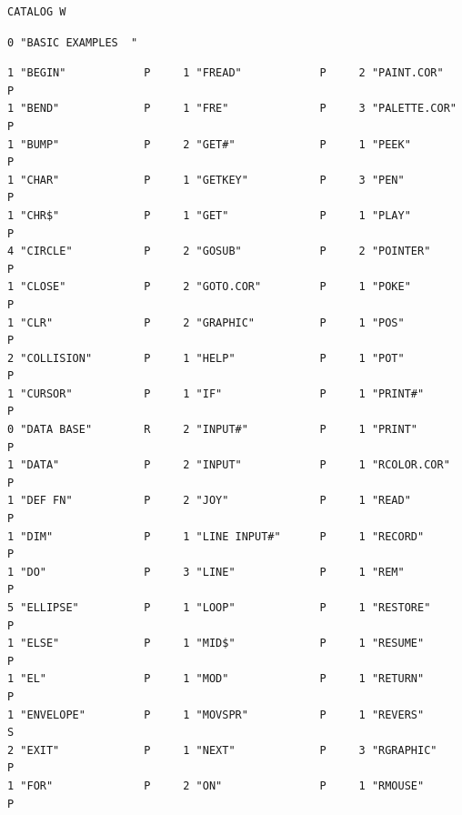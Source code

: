 \begin{description}[leftmargin=2cm,style=nextline]
\begin{tcolorbox}[colback=black,coltext=white]
\verbatimfont{\codefont}
\begin{verbatim}
CATALOG W
\end{verbatim}
\begin{tcolorbox}[colback=white,coltext=black,arc=0mm,boxrule=0mm,
left*=0.5mm,right*=0mm,top=0mm,bottom=0mm,nobeforeafter,
left skip=0.5mm,
width=28mm,height=3mm,valign=center]
\begin{verbatim}
0 "BASIC EXAMPLES  "
\end{verbatim}
\end{tcolorbox}
\begin{verbatim}
1 "BEGIN"            P     1 "FREAD"            P     2 "PAINT.COR"        P
1 "BEND"             P     1 "FRE"              P     3 "PALETTE.COR"      P
1 "BUMP"             P     2 "GET#"             P     1 "PEEK"             P
1 "CHAR"             P     1 "GETKEY"           P     3 "PEN"              P
1 "CHR$"             P     1 "GET"              P     1 "PLAY"             P
4 "CIRCLE"           P     2 "GOSUB"            P     2 "POINTER"          P
1 "CLOSE"            P     2 "GOTO.COR"         P     1 "POKE"             P
1 "CLR"              P     2 "GRAPHIC"          P     1 "POS"              P
2 "COLLISION"        P     1 "HELP"             P     1 "POT"              P
1 "CURSOR"           P     1 "IF"               P     1 "PRINT#"           P
0 "DATA BASE"        R     2 "INPUT#"           P     1 "PRINT"            P
1 "DATA"             P     2 "INPUT"            P     1 "RCOLOR.COR"       P
1 "DEF FN"           P     2 "JOY"              P     1 "READ"             P
1 "DIM"              P     1 "LINE INPUT#"      P     1 "RECORD"           P
1 "DO"               P     3 "LINE"             P     1 "REM"              P
5 "ELLIPSE"          P     1 "LOOP"             P     1 "RESTORE"          P
1 "ELSE"             P     1 "MID$"             P     1 "RESUME"           P
1 "EL"               P     1 "MOD"              P     1 "RETURN"           P
1 "ENVELOPE"         P     1 "MOVSPR"           P     1 "REVERS"           S
2 "EXIT"             P     1 "NEXT"             P     3 "RGRAPHIC"         P
1 "FOR"              P     2 "ON"               P     1 "RMOUSE"           P
\end{verbatim}
\end{tcolorbox}
\end{description}


